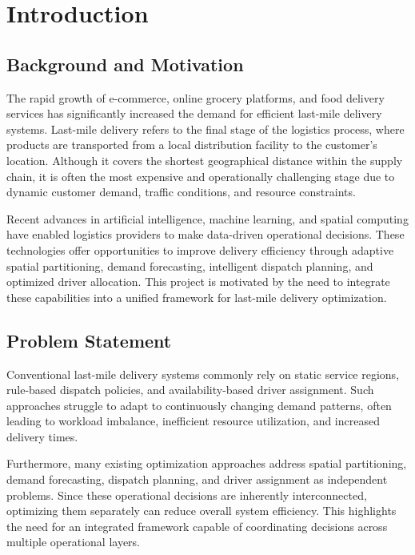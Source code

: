 \documentclass{article}
\begin{document}
\newpage
\section{Introduction}
\label{sec:introduction}

\subsection{Background and Motivation}
\label{subsec:background_and_motivation}

The rapid growth of e-commerce, online grocery platforms, and food delivery services has significantly increased the demand for efficient last-mile delivery systems. Last-mile delivery refers to the final stage of the logistics process, where products are transported from a local distribution facility to the customer's location. Although it covers the shortest geographical distance within the supply chain, it is often the most expensive and operationally challenging stage due to dynamic customer demand, traffic conditions, and resource constraints.

Recent advances in artificial intelligence, machine learning, and spatial computing have enabled logistics providers to make data-driven operational decisions. These technologies offer opportunities to improve delivery efficiency through adaptive spatial partitioning, demand forecasting, intelligent dispatch planning, and optimized driver allocation. This project is motivated by the need to integrate these capabilities into a unified framework for last-mile delivery optimization.

\subsection{Problem Statement}
\label{subsec:problem_statement}

Conventional last-mile delivery systems commonly rely on static service regions, rule-based dispatch policies, and availability-based driver assignment. Such approaches struggle to adapt to continuously changing demand patterns, often leading to workload imbalance, inefficient resource utilization, and increased delivery times.

Furthermore, many existing optimization approaches address spatial partitioning, demand forecasting, dispatch planning, and driver assignment as independent problems. Since these operational decisions are inherently interconnected, optimizing them separately can reduce overall system efficiency. This highlights the need for an integrated framework capable of coordinating decisions across multiple operational layers.
\end{document}
